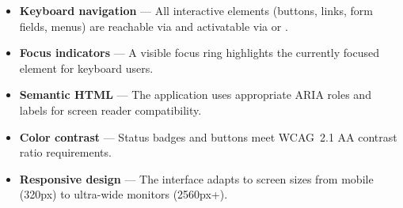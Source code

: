 \begin{itemize}[leftmargin=18pt]
  \item \textbf{Keyboard navigation} --- All interactive elements
        (buttons, links, form fields, menus) are reachable via
         and activatable via  or
        .
  \item \textbf{Focus indicators} --- A visible focus ring
        highlights the currently focused element for keyboard
        users.
  \item \textbf{Semantic HTML} --- The application uses
        appropriate ARIA roles and labels for screen reader
        compatibility.
  \item \textbf{Color contrast} --- Status badges and buttons
        meet WCAG~2.1 AA contrast ratio requirements.
  \item \textbf{Responsive design} --- The interface adapts to
        screen sizes from mobile (320px) to ultra-wide
        monitors (2560px+).
\end{itemize}

\newpage
